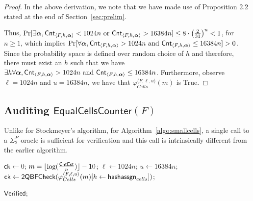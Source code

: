 {\begin{proof}
In the above derivation, we note that we have made use of Proposition 2.2 stated
at the end of Section~\ref{sec:prelim}.

Thus, $\Pr[\exists {\boldsymbol{\alpha}}, \mathsf{Cnt}_{\langle F, h,{\boldsymbol{\alpha}} \rangle} < 1024n \text{ or }  \mathsf{Cnt}_{\langle F, h,{\boldsymbol{\alpha}} \rangle} >  16384n] \leq 8 \cdot \left(\frac{2}{31}\right)^{n}<1$, for $n\geq 1$, which implies $\Pr[\forall {\boldsymbol{\alpha}}, \mathsf{Cnt}_{\langle F, h,{\boldsymbol{\alpha}} \rangle} > 1024n \text{ and }  \mathsf{Cnt}_{\langle F, h,{\boldsymbol{\alpha}} \rangle} \leq  16384n] >0$. 
Since the probability space is defined over random choice of $h$ and  therefore, there must exist an $h$ such that we  have $\exists h \forall {\boldsymbol{\alpha}}, \mathsf{Cnt}_{\langle F, h,{\boldsymbol{\alpha}} \rangle} > 1024n \text{ and }  \mathsf{Cnt}_{\langle F, h,{\boldsymbol{\alpha}} \rangle} \leq  16384n$. Furthermore, observe $\ell = 1024n$ and $u = 16384n$, we have that $\varphi^{\langle F, \ell, u \rangle}_{Cells}(m)$ is True. 

\end{proof}
}


















\subsection{Auditing $\mathsf{EqualCellsCounter}(F)$}

Unlike for Stockmeyer's algorithm, for Algorithm~\ref{algo:smallcells}, a single call to a $\Sigma_2^P$ oracle is sufficient for verification and this call is intrinsically different from the earlier algorithm.















\begin{algorithm}
	\caption{EqualCellsAudit$(F,\mathsf{EqualCellsCounter}(F))$}
	\begin{algorithmic}[1]
          \State $\mathsf{ck}\gets 0$; 
          $m=\lfloor{\log (\frac{\mathsf{CntEst}}{n})\rfloor}-10$; $\ell \gets 1024n$; $u\gets 16384n$;
                 \State  $\mathsf{ck}\gets \mathsf{2QBFCheck} (\varphi_{Cells}^{\langle F, \ell, u\rangle}(m)[h \gets \mathsf{hashassgn}_{cells}])$; \label{line:smallcellscheck}

		\label{line:equalcheck1}                            
                \State \Return $\mathsf{Verified}$;
\EndIf
\end{algorithmic}
        \label{algo:small-cells-audit}
\end{algorithm}

